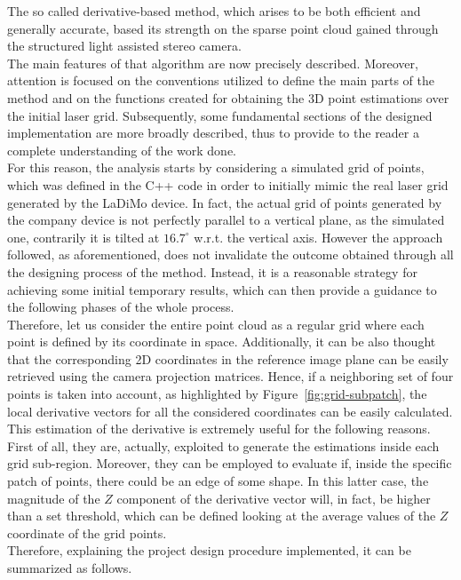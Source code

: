 The so called derivative-based method, which arises to be both efficient and generally accurate, based its strength on the sparse point cloud gained through the structured light assisted stereo camera.\\
The main features of that algorithm are now precisely described.
Moreover, attention is focused on the conventions utilized to define the main parts of the method and on the functions created for obtaining the 3D point estimations over the initial laser grid. 
Subsequently, some fundamental sections of the designed implementation are more broadly described, thus to provide to the reader a complete understanding of the work done. \\
For this reason, the analysis starts by considering a simulated grid of points, which was defined in the C++ code in order to initially mimic the real laser grid generated by the LaDiMo device. 
In fact, the actual grid of points generated by the company device is not perfectly parallel to a vertical plane, as the simulated one, contrarily it is tilted at $16.7^{\circ}$ w.r.t. the vertical axis.
However the approach followed, as aforementioned, does not invalidate the outcome obtained through all the designing process of the method.
Instead, it is a reasonable strategy for achieving some initial temporary results, which can then provide a guidance to the following phases of the whole process.\\
Therefore, let us consider the entire point cloud as a regular grid where each point is defined by its coordinate in space.
Additionally, it can be also thought that the corresponding 2D coordinates in the reference image plane can be easily retrieved using the camera projection matrices.
Hence, if a neighboring set of four points is taken into account, as highlighted by Figure~\ref{fig:grid-subpatch}, the local derivative vectors for all the considered coordinates can be easily calculated.
This estimation of the derivative is extremely useful for the following reasons.
First of all, they are, actually, exploited to generate the estimations inside each grid sub-region.
Moreover, they can be employed to evaluate if, inside the specific patch of points, there could be an edge of some shape. 
In this latter case, the magnitude of the $Z$ component of the derivative vector will, in fact, be higher than a set threshold, which can be defined looking at the average values of the $Z$ coordinate of the grid points.\\
Therefore, explaining the project design procedure implemented, it can be summarized as follows.
